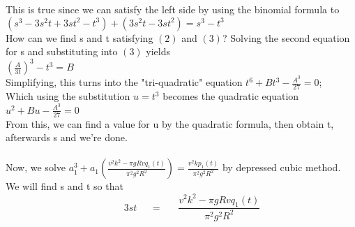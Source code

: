 \documentclass[12pt]{article}
\begin{document}
This is true since we can satisfy the left side by using the binomial formula to \\
$ (s^3-3s^2t+3st^2-t^3)+(3s^2t-3st^2)=s^3-t^3$\\
How can we find s and t satisfying $(2)$ and $(3)$? Solving the second equation for s and substituting into $(3)$ yields\\
$(\frac{A}{3t})^3-t^3=B$\\
Simplifying, this turns into the "tri-quadratic" equation $t^6+Bt^3-\frac{A^3}{27}=0$;\\
Which using the substitution $u=t^3$ becomes the quadratic equation$u^2+Bu-\frac{A^3}{27}=0$\\
From this, we can find a value for u by the quadratic formula, then obtain t, afterwards s and we're done.\\
\\
Now, we solve $ a_1^3+a_1(\frac{v^2k^2-\pi gRvq_1(t)}{\pi^2 g^2R^2})=\frac{v^2kp_1(t)}{\pi^2 g^2R^2}$ by depressed cubic method. We will find s and t so that \\
\begin{equation}
~~~~~~~~~~3st~~~~~~=~~~~~~~\frac{v^2k^2-\pi gRvq_1(t)}{\pi^2 g^2R^2}
\end{equation}
\end{document}

